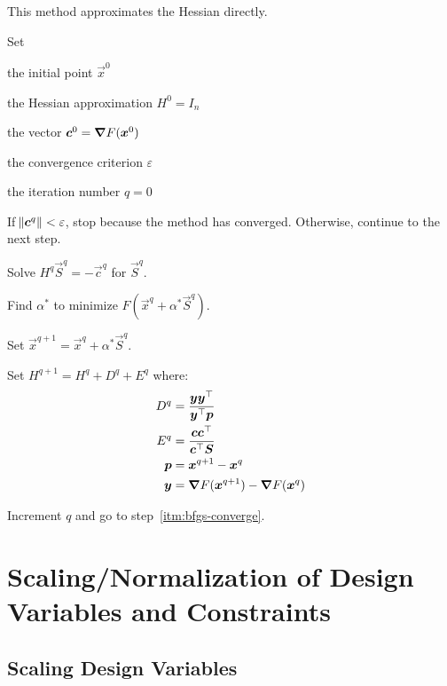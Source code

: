 \documentclass{article}
\begin{document}
This method approximates the Hessian directly.

\begin{enumerate*}
\item Set
  \begin{itemize*}
  \item the initial point \(\vec{x}^0\)
  \item the Hessian approximation \(H^0 = I_n\)
  \item the vector \(\bm{c}^0 = \bm{\nabla} F(\bm{x}^0)\)
  \item the convergence criterion \(\varepsilon\)
  \item the iteration number \(q = 0\)
  \end{itemize*}
\item \label{itm:bfgs-converge} If \(\norm{\bm{c}^q} < \varepsilon\), stop because the method has converged. Otherwise,
  continue to the next step.
\item Solve \(H^q\vec{S}^q = -\vec{c}^q\) for \(\vec{S}^q\).
\item Find \(\alpha^*\) to minimize \(F(\vec{x}^q + \alpha^* \vec{S}^q)\).
\item Set \(\vec{x}^{q+1} = \vec{x}^q + \alpha^* \vec{S}^q\).
\item Set \(H^{q+1} = H^q + D^q + E^q\) where:
  \begin{align*}
    D^q &= \frac{\bm{y}{{\bm{y}}^\top}}{{{\bm{y}}^\top}\bm{p}} \\
    E^q &= \frac{\bm{c}{{\bm{c}}^\top}}{{{\bm{c}}^\top}\bm{S}} \\
    \bm{p} &= \bm{x}^{q+1} - \bm{x}^q \\
    \bm{y} &= \bm{\nabla} F(\bm{x}^{q+1}) - \bm{\nabla} F(\bm{x}^q)
  \end{align*}
\item Increment \(q\) and go to step~\ref{itm:bfgs-converge}.
\end{enumerate*}

\section{Scaling\slash{}Normalization of Design Variables and Constraints}

\subsection{Scaling Design Variables}
\end{document}
